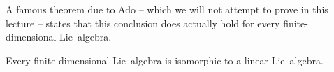 \begin{fluff}
  A famous theorem due to Ado -- which we will not attempt to prove in this lecture -- states that this conclusion does actually hold for every finite-dimensional Lie~algebra.
\end{fluff}


\begin{theorem}
  Every finite-dimensional Lie~algebra is isomorphic to a linear Lie~algebra.
\end{theorem}






